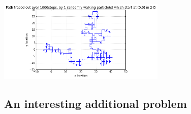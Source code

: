 \documentclass[12pt]{article}
\begin{document}
\begin{enumerate}
\begin{center}
\includegraphics[width=0.6\textwidth]{diff2.png}
\end{center}
\end{enumerate}

\subsection{An interesting additional problem}
\end{document}

